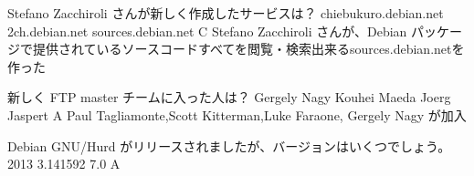 %

\santaku
{Stefano Zacchiroli さんが新しく作成したサービスは？}
{chiebukuro.debian.net}
{2ch.debian.net}
{sources.debian.net}
{C}
{Stefano Zacchiroli さんが、Debian パッケージで提供されているソースコードすべてを閲覧・検索出来るsources.debian.netを作った}

\santaku
{新しく FTP master チームに入った人は？}
{Gergely Nagy} %
{Kouhei Maeda}
{Joerg Jaspert}
{A}
{Paul Tagliamonte,Scott Kitterman,Luke Faraone, Gergely Nagy が加入}

\santaku
{Debian GNU/Hurd がリリースされましたが、バージョンはいくつでしょう。}
{2013}
{3.141592}
{7.0}
{A}
{}

